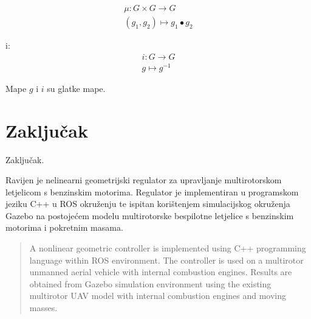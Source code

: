 \documentclass[times, utf8, diplomski]{fer}
\begin{document}
	\begin{gather}
		\mu: G \times G \rightarrow G \\
		(g_1, g_2) \mapsto g_1 \bullet g_2
	\end{gather}
	
	i: 
	\begin{gather}
		i: G \rightarrow G \\
		g \mapsto g^{-1}		
	\end{gather}
	
	Mape $g$ i $i$ su glatke mape. \\
	\newpage
	\clearpage
	
\chapter{Zaključak}
Zaključak.




\begin{sazetak}
Ravijen je nelinearni geometrijski regulator za upravljanje multirotorskom letjelicom s benzinskim motorima. Regulator je implementiran u programskom jeziku C++ u ROS okruženju te ispitan korištenjem simulacijskog okruženja Gazebo na postojećem modelu multirotorske bespilotne letjelice s benzinskim motorima i pokretnim masama.

\end{sazetak}

\begin{abstract}
A nonlinear geometric controller is implemented using C++ programming language within ROS environment. The controller is used on a multirotor unmanned aerial vehicle with internal combustion engines. Results are obtained from Gazebo simulation environment using the existing multirotor UAV model with internal combustion engines and moving masses.

\end{abstract}
\end{document}
